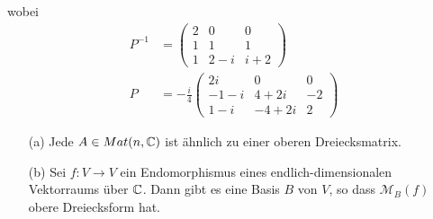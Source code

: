 wobei
\begin{align}
P^{-1} &= \begin{pmatrix} 2 & 0 & 0 \\ 1 & 1 & 1 \\ 1 & 2-i & i + 2\end{pmatrix} \\
P &= -\frac{i}{4}\begin{pmatrix} 2i & 0 & 0 \\ -1-i & 4 + 2i & -2 \\ 1-i & -4 +2i & 2 \end{pmatrix}
\end{align}

\begin{satz} %
\label{satz241}
\begin{itemize}
\item[(a)] Jede $A\in Mat(n, \mathbb{C})$ ist ähnlich zu einer oberen Dreiecksmatrix.
\item[(b)] Sei $f: V \rightarrow V$ ein Endomorphismus eines endlich-dimensionalen Vektorraums über $\mathbb{C}$. Dann gibt es eine Basis $B$ von $V$, so dass $\mathcal{M}_B(f)$ obere Dreiecksform hat.
\end{itemize}
\end{satz}

